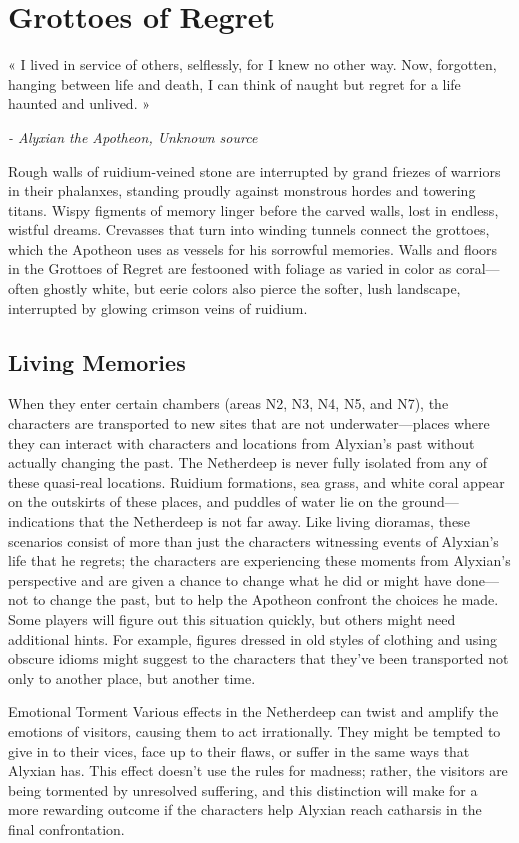 \documentclass[10pt,a4,twoside,twocolumn,openany,nodeprecatedcode]{dndbook}
\begin{document}
\section{Grottoes of Regret}
\begingroup
\DndSetThemeColor[DmgLavender]\begin{DndSidebar}{}
\Large \centering «
\large \centering I lived in service of others, selflessly, for I knew no other way. Now, forgotten, hanging between life and death, I can think of naught but regret for a life haunted and unlived.
\Large »
 
 \normalsize \raggedleft \textit{ - Alyxian the Apotheon, Unknown source}
\end{DndSidebar}
\endgroup
Rough walls of ruidium-veined stone are interrupted by grand friezes of warriors in their phalanxes, standing proudly against monstrous hordes and towering titans. Wispy figments of memory linger before the carved walls, lost in endless, wistful dreams. Crevasses that turn into winding tunnels connect the grottoes, which the Apotheon uses as vessels for his sorrowful memories.
Walls and floors in the Grottoes of Regret are festooned with foliage as varied in color as coral—often ghostly white, but eerie colors also pierce the softer, lush landscape, interrupted by glowing crimson veins of ruidium.
\subsection{Living Memories}
When they enter certain chambers (areas N2, N3, N4, N5, and N7), the characters are transported to new sites that are not underwater—places where they can interact with characters and locations from Alyxian's past without actually changing the past. The Netherdeep is never fully isolated from any of these quasi-real locations. Ruidium formations, sea grass, and white coral appear on the outskirts of these places, and puddles of water lie on the ground—indications that the Netherdeep is not far away.
Like living dioramas, these scenarios consist of more than just the characters witnessing events of Alyxian's life that he regrets; the characters are experiencing these moments from Alyxian's perspective and are given a chance to change what he did or might have done—not to change the past, but to help the Apotheon confront the choices he made. Some players will figure out this situation quickly, but others might need additional hints. For example, figures dressed in old styles of clothing and using obscure idioms might suggest to the characters that they've been transported not only to another place, but another time.
\begin{DndComment}{Emotional Torment}
Various effects in the Netherdeep can twist and amplify the emotions of visitors, causing them to act irrationally. They might be tempted to give in to their vices, face up to their flaws, or suffer in the same ways that Alyxian has. This effect doesn't use the rules for madness; rather, the visitors are being tormented by unresolved suffering, and this distinction will make for a more rewarding outcome if the characters help Alyxian reach catharsis in the final confrontation.
\end{DndComment}
\end{document}
